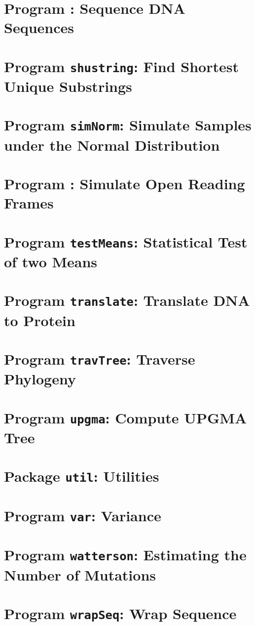 \documentclass[a4paper]{report}
\begin{document}
\chapter{Program : Sequence DNA Sequences}\label{ch:seq}

\chapter{Program \texttt{shustring}: Find Shortest Unique Substrings}\label{ch:shu}

\chapter{Program \texttt{simNorm}: Simulate Samples under the Normal
  Distribution}\label{ch:sn}

\chapter{Program : Simulate Open Reading
  Frames}\label{ch:so}

\chapter{Program \texttt{testMeans}: Statistical Test of two Means}\label{ch:tm}

\chapter{Program \texttt{translate}: Translate DNA to
  Protein}\label{ch:tr}

\chapter{Program \texttt{travTree}: Traverse Phylogeny}\label{ch:tt}

\chapter{Program \texttt{upgma}: Compute UPGMA Tree}\label{ch:upgma}

\chapter{Package \texttt{util}: Utilities}\label{ch:uti}

\chapter{Program \texttt{var}: Variance}\label{ch:var}

\chapter{Program \texttt{watterson}: Estimating the Number of Mutations}\label{ch:wat}

\chapter{Program \texttt{wrapSeq}: Wrap Sequence}\label{ch:wra}



\end{document}
